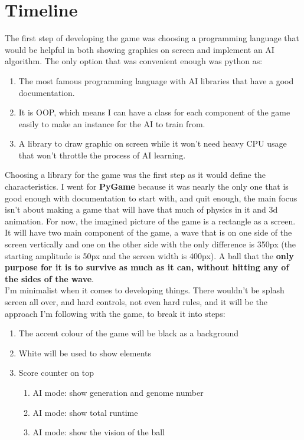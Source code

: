 
\chapter{Timeline}
The first step of developing the game was choosing a programming language that would be helpful in both showing graphics on screen and implement an AI algorithm. The only option that was convenient enough was python as:

\begin{enumerate}
	\item The most famous programming language with AI libraries that have a good documentation.
	\item It is OOP, which means I can have a class for each component of the game easily to make an instance for the AI to train from.
	\item A library to draw graphic on screen while it won't need heavy CPU usage that won't throttle the process of AI learning.
\end{enumerate}

Choosing a library for the game was the first step as it would define the characteristics. I went for \textbf{PyGame} because it was nearly the only one that is good enough with documentation to start with, and quit enough, the main focus isn't about making a game that will have that much of physics in it and 3d animation. For now, the imagined picture of the game is a rectangle as a screen. It will have two main component of the game, a wave that is on one side of the screen vertically and one on the other side with the only difference is 350px (the starting amplitude is 50px and the screen width is 400px). A ball that the \textbf{only purpose for it is to survive as much as it can, without hitting any of the sides of the wave}.\\


I'm minimalist when it comes to developing things. There wouldn't be splash screen all over, and hard controls, not even hard rules, and it will be the approach I'm following with the game, to break it into steps:

\begin{enumerate}
	\item The accent colour of the game will be black as a background
	\item White will be used to show elements 
	\item Score counter on top
	  \begin{enumerate}
		\item AI mode: show generation and genome number
		\item AI mode: show total runtime
		\item AI mode: show the vision of the ball
	\end{enumerate}
\end{enumerate}

